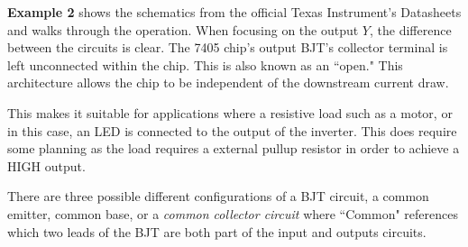 \documentclass[12pt]{report}
\begin{document}
\textbf{Example 2} shows the schematics from the official Texas Instrument's Datasheets and walks through the operation. When focusing on the output \(Y\), the difference between the circuits is clear.
The 7405 chip's output BJT's collector terminal is left unconnected within the chip. This is also known as an ``open." This architecture allows the chip to be independent of the downstream current draw.

This makes it suitable for applications where a resistive load such as a motor, or in this case, an LED is connected to the output of the inverter.
This does require some planning as the load requires a external pullup resistor in order to achieve a HIGH output.

There are three possible different configurations of a BJT circuit, a common emitter, common base, or a \textit{common collector circuit} where ``Common" references which two leads of the BJT are both part of the input and outputs circuits.
\end{document}
